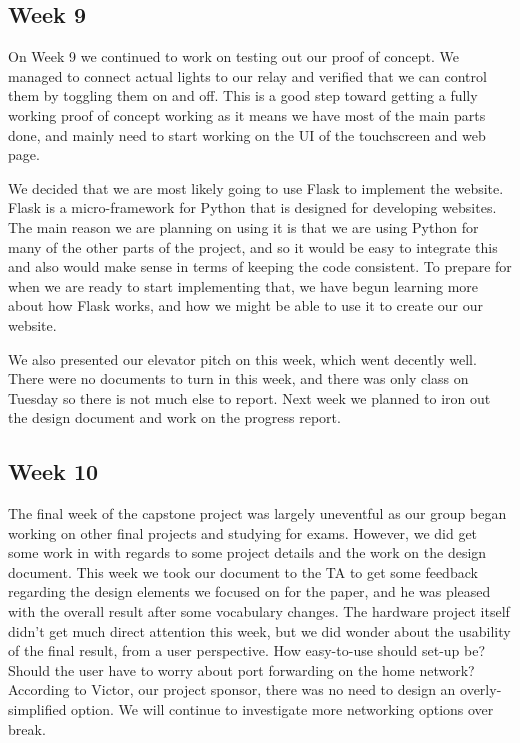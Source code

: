 \documentclass[letterpaper,10pt]{article}
\begin{document}
\subsection{Week 9}
 
On Week 9 we continued to work on testing out our proof of concept. We managed to connect actual lights to our relay and verified that we can control them by toggling them on and off. This is a good step toward getting a fully working proof of concept working as it means we have most of the main parts done, and mainly need to start working on the UI of the touchscreen and web page.

We decided that we are most likely going to use Flask to implement the website. Flask is a micro-framework for Python that is designed for developing websites. The main reason we are planning on using it is that we are using Python for many of the other parts of the project, and so it would be easy to integrate this and also would make sense in terms of keeping the code consistent. To prepare for when we are ready to start implementing that, we have begun learning more about how Flask works, and how we might be able to use it to create our our website.

We also presented our elevator pitch on this week, which went decently well. There were no documents to turn in this week, and there was only class on Tuesday so there is not much else to report. Next week we planned to iron out the design document and work on the progress report. 

\subsection{Week 10}
The final week of the capstone project was largely uneventful as our group began working on other final projects and studying for exams. However, we did get some work in with regards to some project details and the work on the design document. This week we took our document to the TA to get some feedback regarding the design elements we focused on for the paper, and he was pleased with the overall result after some vocabulary changes. The hardware project itself didn't get much direct attention this week, but we did wonder about the usability of the final result, from a user perspective. How easy-to-use should set-up be? Should the user have to worry about port forwarding on the home network? According to Victor, our project sponsor, there was no need to design an overly-simplified option. We will continue to investigate more networking options over break.
\end{document}
